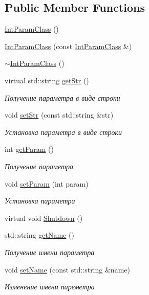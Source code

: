 \subsection*{Public Member Functions}
\begin{DoxyCompactItemize}
\item 
\hyperlink{class_int_param_class_af146bb724848136903faed565cf03e79}{Int\+Param\+Class} ()
\item 
\hyperlink{class_int_param_class_abf6e8556685f3787038b8bed0e295891}{Int\+Param\+Class} (const \hyperlink{class_int_param_class}{Int\+Param\+Class} \&)
\item 
\hyperlink{class_int_param_class_a6acfd8c28b6fd9b23d49f4a72de19170}{$\sim$\+Int\+Param\+Class} ()
\item 
virtual std\+::string \hyperlink{class_int_param_class_a63e23466747d1303a7ed40fd23edbbb1}{get\+Str} ()
\begin{DoxyCompactList}\small\item\em Получение параметра в виде строки \end{DoxyCompactList}\item 
void \hyperlink{class_int_param_class_af7fdd091d24986adef64f708b1d7fc11}{set\+Str} (const std\+::string \&str)
\begin{DoxyCompactList}\small\item\em Установка параметра в виде строки \end{DoxyCompactList}\item 
int \hyperlink{class_int_param_class_a9a3aad6c9c11c583955288c328dbede3}{get\+Param} ()
\begin{DoxyCompactList}\small\item\em Получение параметра \end{DoxyCompactList}\item 
void \hyperlink{class_int_param_class_a88b39fd564e8061753178471e6a59097}{set\+Param} (int param)
\begin{DoxyCompactList}\small\item\em Установка параметра \end{DoxyCompactList}\item 
virtual void \hyperlink{class_set_param_class_afdb63374ca8c32f6678ba34e050e9071}{Shutdown} ()
\item 
std\+::string \hyperlink{class_set_param_class_a6c14fce9f4a896f6470888f3cacfb025}{get\+Name} ()
\begin{DoxyCompactList}\small\item\em Получение имени параметра \end{DoxyCompactList}\item 
void \hyperlink{class_set_param_class_aeabf85ad5a078ab4abb8f09a67f2c8e0}{set\+Name} (const std\+::string \&name)
\begin{DoxyCompactList}\small\item\em Изменение имени пареметра \end{DoxyCompactList}\end{DoxyCompactItemize}
